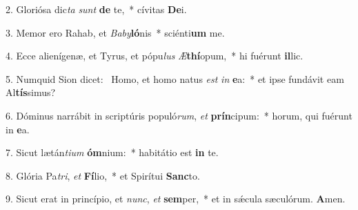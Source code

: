 2. Gloriósa dic\textit{ta} \textit{sunt} \textbf{de} te,~*  cívitas \textbf{De}i.\

3. Memor ero Rahab, et \textit{Ba}\textit{by}\textbf{ló}nis~*  sciénti\textbf{um} me.\

4. Ecce alienígenæ, et Tyrus, et pópu\textit{lus} \textit{Æ}\textbf{thí}opum,~*  hi fuérunt \textbf{il}lic.\

5. Numquid Sion dicet: \dag\  Homo, et homo natus \textit{est} \textit{in} \textbf{e}a:~*  et ipse fundávit eam Al\textbf{tís}simus?\

6. Dóminus narrábit in scriptúris populó\textit{rum}, \textit{et} \textbf{prín}cipum:~*  horum, qui fuérunt in \textbf{e}a.\

7. Sicut lætán\textit{ti}\textit{um} \textbf{óm}nium:~*  habitátio est \textbf{in} te.\

8. Glória Pa\textit{tri}, \textit{et} \textbf{Fí}lio,~*  et Spirítui \textbf{Sanc}to.\

9. Sicut erat in princípio, et \textit{nunc}, \textit{et} \textbf{sem}per,~*  et in sǽcula sæculórum. \textbf{A}men.\

